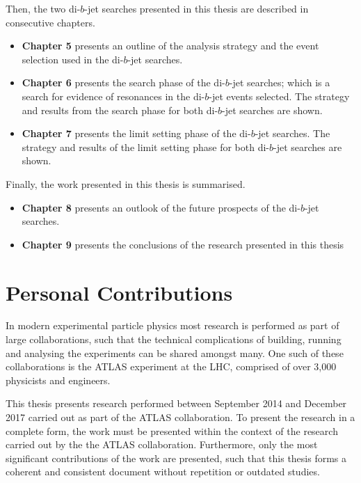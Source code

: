 \noindent
Then, the two di-$b$-jet searches presented in this thesis are described in consecutive chapters. %
\vspace{-2em}
\begin{itemize}[leftmargin=*]
\item\textbf{Chapter 5} presents an outline of the analysis strategy and the event selection used in the \mbox{di-$b$-jet} searches.%
\item\textbf{Chapter 6} presents the search phase of the di-$b$-jet searches;
  which is a search for evidence of resonances in the di-$b$-jet events selected.
  The strategy and results from the search phase for both di-$b$-jet searches are shown.%
\item\textbf{Chapter 7} presents the limit setting phase of the di-$b$-jet searches.
  The strategy and results of the limit setting phase for both di-$b$-jet searches are shown.%
\end{itemize}

\noindent
Finally, the work presented in this thesis is summarised.
\vspace{-0.5em}
  \begin{itemize}[leftmargin=*]
\item\textbf{Chapter 8} presents an outlook of the future prospects of the di-$b$-jet searches.%
\item\textbf{Chapter 9} presents the conclusions of the research presented in this thesis%
\end{itemize}
\clearpage
\section{Personal Contributions}

In modern experimental particle physics most research is performed as part of large collaborations,
such that the technical complications of building, running and analysing the experiments can be shared amongst many.
One such of these collaborations is the ATLAS experiment at the LHC, comprised of over 3,000 physicists and engineers.

This thesis presents research performed between September 2014 and December 2017 carried out as part of the ATLAS collaboration.
To present the research in a complete form, the work must be presented within the context of the research carried out by the the ATLAS collaboration.
Furthermore, only the most significant contributions of the work are presented,
such that this thesis forms a coherent and consistent document without repetition or outdated studies.

